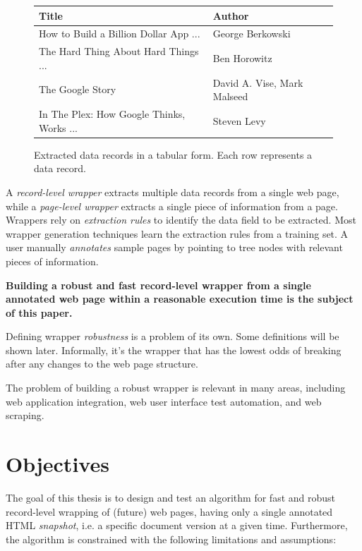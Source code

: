 \begin{figure}[h]
	\centering
    \begin{tabularx}{\textwidth}{ | l | l | }
		\hline
		\textbf{Title} & \textbf{Author} \\ 
		\hline
		How to Build a Billion Dollar App ... & George Berkowski \\ 
		\hline
		The Hard Thing About Hard Things ... & Ben Horowitz \\ 
		\hline
		The Google Story & David A. Vise, Mark Malseed \\ 
		\hline
		In The Plex: How Google Thinks, Works ... & Steven Levy \\ 
		\hline
    \end{tabularx}
	\caption{Extracted data records in a tabular form. Each row represents a data record.}
	\label{fig:data-records-in-tabular-form}
\end{figure}

A \emph{record-level wrapper} extracts multiple data records from a single web page, while a \emph{page-level wrapper} extracts a single piece of information from a page. Wrappers rely on \emph{extraction rules} to identify the data field to be extracted. Most wrapper generation techniques learn the extraction rules from a training set. A user manually \emph{annotates} sample pages by pointing to tree nodes with relevant pieces of information.

\textbf{Building a robust and fast record-level wrapper from a single annotated web page within a reasonable execution time is the subject of this paper.}

Defining wrapper \emph{robustness} is a problem of its own. Some definitions will be shown later. Informally, it's the wrapper that has the lowest odds of breaking after any changes to the web page structure.

The problem of building a robust wrapper is relevant in many areas, including web application integration, web user interface test automation, and web scraping.


\section{Objectives}

The goal of this thesis is to design and test an algorithm for fast and robust record-level wrapping of (future) web pages, having only a single annotated HTML \emph{snapshot}, i.e. a specific document version at a given time. Furthermore, the algorithm is constrained with the following limitations and assumptions:

